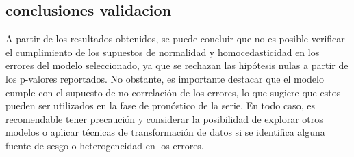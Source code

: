 \documentclass[11pt]{article}
\begin{document}
\subsection{conclusiones validacion}
A partir de los resultados obtenidos, se puede concluir que no es posible verificar el cumplimiento de los supuestos de normalidad y homocedasticidad en los errores del modelo seleccionado, ya que se rechazan las hipótesis nulas a partir de los p-valores reportados. No obstante, es importante destacar que el modelo cumple con el supuesto de no correlación de los errores, lo que sugiere que estos pueden ser utilizados en la fase de pronóstico de la serie. En todo caso, es recomendable tener precaución y considerar la posibilidad de explorar otros modelos o aplicar técnicas de transformación de datos si se identifica alguna fuente de sesgo o heterogeneidad en los errores.
\end{document}
